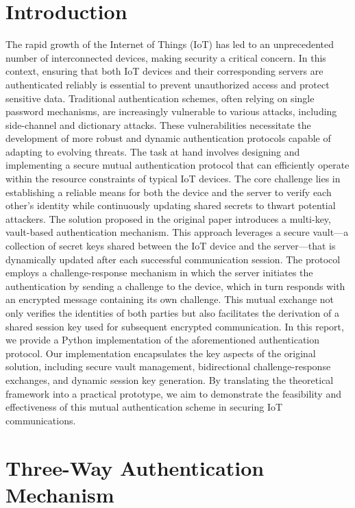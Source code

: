 \documentclass[10pt,twocolumn,letterpaper]{article}
\begin{document}
\section{Introduction}
The rapid growth of the Internet of Things (IoT) has led to an unprecedented number of interconnected devices, making security a critical concern.
In this context, ensuring that both IoT devices and their corresponding servers are authenticated reliably is essential to prevent unauthorized access and protect sensitive data.
Traditional authentication schemes, often relying on single password mechanisms, are increasingly vulnerable to various attacks, including side-channel and dictionary attacks.
These vulnerabilities necessitate the development of more robust and dynamic authentication protocols capable of adapting to evolving threats.
The task at hand involves designing and implementing a secure mutual authentication protocol that can efficiently operate within the resource constraints of typical IoT devices.
The core challenge lies in establishing a reliable means for both the device and the server to verify each other's identity while continuously updating shared secrets to thwart potential attackers.
The solution proposed in the original paper introduces a multi-key, vault-based authentication mechanism. This approach leverages a secure vault—a collection of secret keys shared between the IoT device and the server—that is dynamically updated after each successful communication session.
The protocol employs a challenge-response mechanism in which the server initiates the authentication by sending a challenge to the device, which in turn responds with an encrypted message containing its own challenge. This mutual exchange not only verifies the identities of both parties but also facilitates the derivation of a shared session key used for subsequent encrypted communication.
In this report, we provide a Python implementation of the aforementioned authentication protocol. Our implementation encapsulates the key aspects of the original solution, including secure vault management, bidirectional challenge-response exchanges, and dynamic session key generation.
By translating the theoretical framework into a practical prototype, we aim to demonstrate the feasibility and effectiveness of this mutual authentication scheme in securing IoT communications.
\section{Three-Way Authentication Mechanism}
\end{document}
